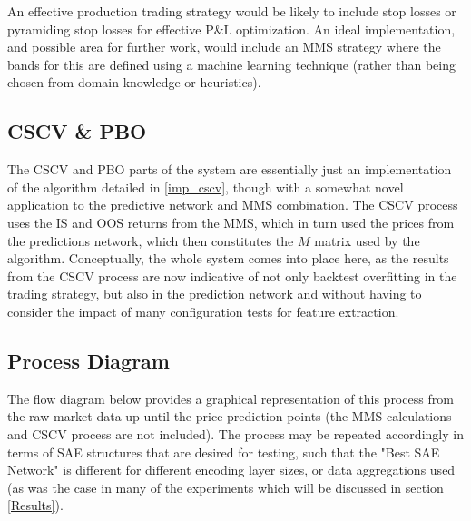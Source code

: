 \documentclass[a4paper,11pt,oneside]{article}
\theoremstyle{plain}
\theoremstyle{definition}
\begin{document}
An effective production trading strategy would be likely to include stop losses or pyramiding stop losses for effective P\&L optimization. An ideal implementation, and possible area for further work, would include an MMS strategy where the bands for this are defined using a machine learning technique (rather than being chosen from domain knowledge or heuristics).\newline


\subsection{CSCV \& PBO}\label{proc_cscv}

The CSCV and PBO parts of the system are essentially just an implementation of the algorithm detailed in \ref{imp_cscv}, though with a somewhat novel application to the predictive network and MMS combination. The CSCV process uses the IS and OOS returns from the MMS, which in turn used the prices from the predictions network, which then constitutes the $M$ matrix used by the algorithm. Conceptually, the whole system comes into place here, as the results from the CSCV process are now indicative of not only backtest overfitting in the trading strategy, but also in the prediction network and without having to consider the impact of many configuration tests for feature extraction.

\subsection{Process Diagram}\label{proc_diagram}

The flow diagram below provides a graphical representation of this process from the raw market data up until the price prediction points (the MMS calculations and CSCV process are not included). The process may be repeated accordingly in terms of SAE structures that are desired for testing, such that the "Best SAE Network" is different for different encoding layer sizes, or data aggregations used (as was the case in many of the experiments which will be discussed in section \ref{Results}).
\end{document}
